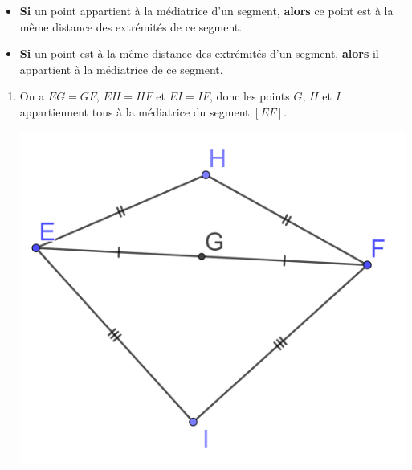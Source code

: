 \documentclass[xcolor={dvipsnames}]{beamer}
\begin{document}
\begin{frame}
	\begin{myprops}
		\begin{itemize}
			\item \textbf{Si} un point appartient à la médiatrice d'un segment, \textbf{alors} ce point est à la même distance des extrémités de ce segment. 
			\item \textbf{Si} un point est à la même distance des extrémités d'un segment, \textbf{alors} il appartient à la médiatrice de ce segment. 			
		\end{itemize}
	\end{myprops}
	
	
	\begin{myexs}
		\begin{enumerate}
						
			\item On a $EG=GF$, $EH=HF$ et $EI=IF$, donc les points $G$, $H$ et $I$ appartiennent tous à la médiatrice du segment $[EF]$.
			
			\begin{center}
				\includegraphics[scale=0.1]{med3}
			\end{center}
			
		\end{enumerate}
		
		
	\end{myexs}
	
\end{frame}
\end{document}
